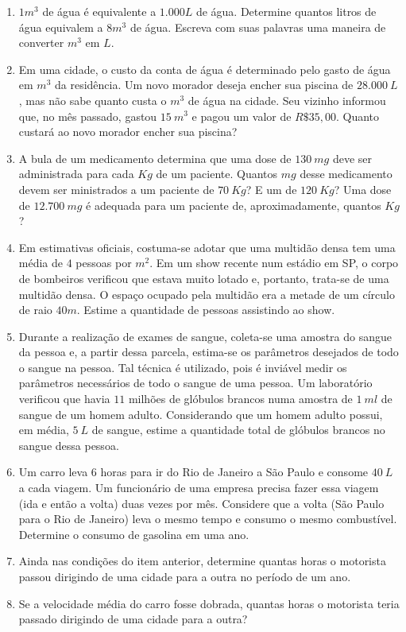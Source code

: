 \documentclass[12pt]{report}
\newcommand{\1}{\faThermometerEmpty}
\newcommand{\2}{\faThermometerQuarter}
\newcommand{\3}{\faThermometerHalf}
\newcommand{\4}{\faThermometerThreeQuarters}
\newcommand{\5}{\faThermometerFull}
\begin{document}
\begin{enumerate}
\begin{enumerate}
\item $1m^3$ de água é equivalente a $1.000L$ de água. Determine quantos litros de água equivalem a $8m^3$ de água. Escreva com suas palavras uma maneira de converter $m^3$ em $L$.
\item Em uma cidade, o custo da conta de água é determinado pelo gasto de água em $m^3$ da residência. Um novo morador deseja encher sua piscina de $28.000\ L$, mas não sabe quanto custa o $m^3$ de água na cidade. Seu vizinho informou que, no mês passado, gastou $15\ m^3$ e pagou um valor de $R\$35,00$. Quanto custará ao novo morador encher sua piscina?
\item A bula de um medicamento determina que uma dose de $130\ mg$ deve ser administrada para cada $Kg$ de um paciente. Quantos $mg$ desse medicamento devem ser ministrados a um paciente de $70\ Kg$? E um de $120\ Kg$? Uma dose de $12.700\ mg$ é adequada para um paciente de, aproximadamente, quantos $Kg$?
\item Em estimativas oficiais, costuma-se adotar que uma multidão densa tem uma média de $4$ pessoas por $m^2$. Em um show recente num estádio em SP, o corpo de bombeiros verificou que estava muito lotado e, portanto, trata-se de uma multidão densa. O espaço ocupado pela multidão era a metade de um círculo de raio $40m$. Estime a quantidade de pessoas assistindo ao show.
\item Durante a realização de exames de sangue, coleta-se uma amostra do sangue da pessoa e, a partir dessa parcela, estima-se os parâmetros desejados de todo o sangue na pessoa. Tal técnica é utilizado, pois é inviável medir os parâmetros necessários de todo o sangue de uma pessoa. Um laboratório verificou que havia $11$ milhões de glóbulos brancos numa amostra de $1 \ ml$ de sangue de um homem adulto. Considerando que um homem adulto possui, em média, $5 \ L$ de sangue, estime a quantidade total de glóbulos brancos no sangue dessa pessoa.
\item Um carro leva $6$ horas para ir do Rio de Janeiro a São Paulo e consome $40\ L$ a cada viagem. Um funcionário de uma empresa precisa fazer essa viagem (ida e então a volta) duas vezes por mês. Considere que a volta (São Paulo para o Rio de Janeiro) leva o mesmo tempo e consumo o mesmo combustível. Determine o consumo de gasolina em uma ano.
\item Ainda nas condições do item anterior, determine quantas horas o motorista passou dirigindo de uma cidade para a outra no período de um ano.
\item Se a velocidade média do carro fosse dobrada, quantas horas o motorista teria passado dirigindo de uma cidade para a outra?

\end{enumerate}
\end{enumerate}
\end{document}
